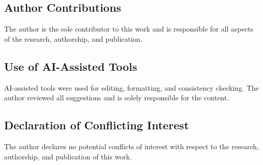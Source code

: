 \documentclass[11pt]{article}
\theoremstyle{plain}
\theoremstyle{definition}
\theoremstyle{remark}
\begin{document}
\subsection*{Author Contributions}
The author is the sole contributor to this work and
is responsible for all aspects of the research, authorship, and publication.

\subsection*{Use of AI-Assisted Tools}
AI-assisted tools were used for editing, formatting, and consistency checking.
The author reviewed all suggestions and is solely responsible for the content.

\subsection*{Declaration of Conflicting Interest}
The author declares no potential conflicts of interest with respect to the
research, authorship, and publication of this work.
\end{document}
